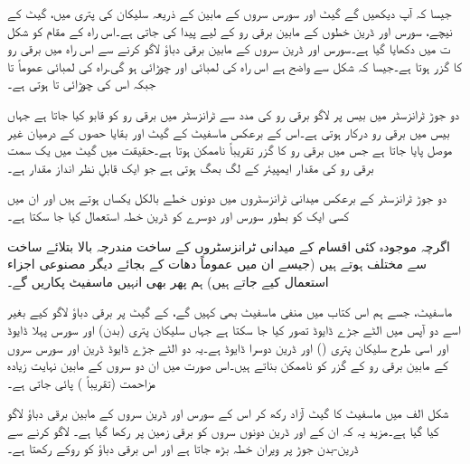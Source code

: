 جیسا کہ آپ دیکھیں گے گیٹ اور سورس سروں کے مابین   کے ذریعہ سلیکان کی پتری میں، گیٹ کے نیچے، سورس اور ڈرین خطوں کے مابین برقی رو کے لیے   پیدا کی جاتی ہے۔اس راہ کے مقام کو شکل  ت میں دکھایا گیا ہے۔سورس اور ڈرین سروں کے مابین برقی دباؤ لاگو کرنے سے اس راہ میں برقی رو کا گزر ہوتا ہے۔جیسا کہ شکل سے واضح ہے اس راہ کی لمبائی  اور چوڑائی  ہو گی۔راہ کی لمبائی عموماً    تا  جبکہ اس کی چوڑائی  تا  ہوتی ہے۔

دو جوڑ ٹرانزسٹر میں بیس پر لاگو برقی رو کی مدد سے ٹرانزسٹر میں برقی رو  کو قابو کیا جاتا ہے جہاں بیس میں  برقی رو درکار ہوتی ہے۔اس کے برعکس ماسفیٹ کے گیٹ  اور بقایا حصوں کے درمیان غیر موصل  پایا جاتا ہے جس میں برقی رو کا گزر تقریباً ناممکن ہوتا ہے۔حقیقت میں گیٹ میں یک سمت برقی رو کی مقدار  ایمپیئر کے لگ بھگ  ہوتی ہے جو ایک قابلِ نظر انداز مقدار ہے۔

دو جوڑ ٹرانزسٹر کے برعکس میدانی ٹرانزسٹروں میں دونوں  خطے بالکل یکساں ہوتے ہیں اور ان میں کسی ایک کو بطور سورس اور دوسرے کو ڈرین خطہ استعمال کیا جا سکتا ہے۔ 

اگرچہ موجودہ کئی اقسام کے میدانی ٹرانزسٹروں کے ساخت مندرجہ بالا بتلائے ساخت سے مختلف ہوتے ہیں (جیسے ان میں عموماً دھات کے بجائے دیگر مصنوعی  اجزاء استعمال کیے جاتے ہیں) ہم پھر بھی انہیں ماسفیٹ پکاریں گے۔


 ماسفیٹ، جسے ہم اس کتاب میں منفی ماسفیٹ بھی کہیں گے، کے گیٹ پر برقی دباؤ لاگو کیے بغیر اسے دو آپس میں الٹے جڑے ڈایوڈ تصور کیا جا سکتا ہے جہاں  سلیکان پتری (بدن) اور   سورس پہلا ڈایوڈ اور اسی طرح   سلیکان پتری () اور   ڈرین دوسرا ڈایوڈ ہے۔یہ دو الٹے جڑے ڈایوڈ ڈرین اور سورس سروں کے مابین برقی رو کے گزر کو ناممکن بناتے ہیں۔اس صورت میں ان دو سروں کے مابین نہایت زیادہ مزاحمت (تقریباً   ) پائی جاتی ہے۔

شکل  الف میں ماسفیٹ کا گیٹ آزاد رکھ کر اس کے سورس اور ڈرین سروں کے مابین برقی دباؤ  لاگو کیا گیا ہے۔مزید یہ کہ ان کے  اور ڈرین دونوں سروں کو برقی زمین پر رکھا گیا ہے۔   لاگو کرنے سے ڈرین-بدن جوڑ پر ویران خطہ بڑھ جاتا ہے اور اس برقی دباؤ کو روکے رکھتا ہے۔

